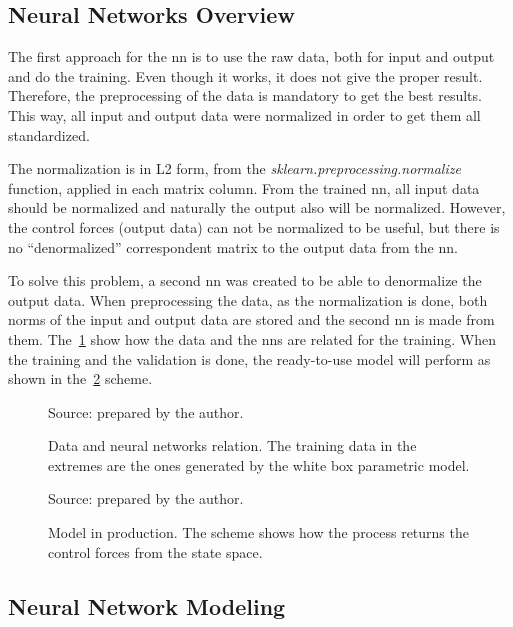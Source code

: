\subsection{Neural Networks Overview}

The first approach for the \gls*{nn} is to use the raw data, both for input and output and do the training.
Even though it works, it does not give the proper result.
Therefore, the preprocessing of the data is mandatory to get the best results.
This way, all input and output data were normalized in order to get them all standardized.

The normalization is in L2 form, from the \emph{sklearn.preprocessing.normalize} function, applied in each matrix column.
From the trained \gls*{nn}, all input data should be normalized and naturally the output also will be normalized.
However, the control forces (output data) can not be normalized to be useful, but there is no ``denormalized'' correspondent matrix to the output data from the \gls*{nn}.

To solve this problem, a second \gls*{nn} was created to be able to denormalize the output data.
When preprocessing the data, as the normalization is done, both norms of the input and output data are stored and the second \gls*{nn} is made from them.
The~\cref{fig:nns_scheme} show how the data and the \glspl{nn} are related for the training. 
When the training and the validation is done, the ready-to-use model will perform as shown in the~\cref{fig:full_scheme} scheme.

\begin{figure}[!htb]
    \centering
    \caption[Data and neural networks relation]{Data and neural networks relation. The training data in the extremes are the ones generated by the white box parametric model.}
    

    {\footnotesize Source: prepared by the author.}
    \label{fig:nns_scheme}
\end{figure}

\begin{figure}[!htb]
    \centering
    \caption[Model in production]{Model in production. The scheme shows how the process returns the control forces from the state space.}
    

    {\footnotesize Source: prepared by the author.}
    \label{fig:full_scheme}
\end{figure}

\subsection{Neural Network Modeling}

